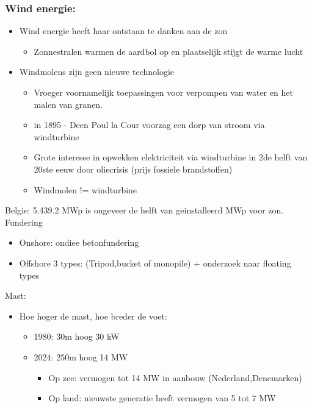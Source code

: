 \documentclass[12pt]{article}
\begin{document}
\subsubsection{Wind energie:}
\begin{itemize}
    \item Wind energie heeft haar ontstaan te danken aan de zon\begin{itemize}
        \item Zonnestralen warmen de aardbol op en plaatselijk stijgt de warme lucht
    \end{itemize}
    \item Windmolens zijn geen nieuwe technologie\begin{itemize}
        \item Vroeger voornamelijk toepassingen voor verpompen van water en het malen van granen.
        \item in 1895 - Deen Poul la Cour voorzag een dorp van stroom via windturbine
        \item Grote interesse in opwekken elektriciteit via windturbine in 2de helft van 20ste eeuw door oliecrisis (prijs fossiele brandstoffen)
        \item Windmolen != windturbine
    \end{itemize}
\end{itemize}
Belgie: 5.439.2 MWp is ongeveer de helft van geinstalleerd MWp voor zon.\newline
Fundering
\begin{itemize}
    \item Onshore: ondiee betonfundering 
    \item Offshore 3 types: (Tripod,bucket of monopile) + onderzoek naar floating types
\end{itemize}
Mast:\begin{itemize}
    \item Hoe hoger de mast, hoe breder de voet:\begin{itemize}
        \item 1980: 30m hoog 30 kW 
        \item 2024: 250m hoog 14 MW\begin{itemize}
            \item Op zee: vermogen tot 14 MW in aanbouw (Nederland,Denemarken)
            \item Op land: nieuwste generatie heeft vermogen van 5 tot 7 MW 
        \end{itemize}
    \end{itemize}
\end{itemize}
\end{document}
